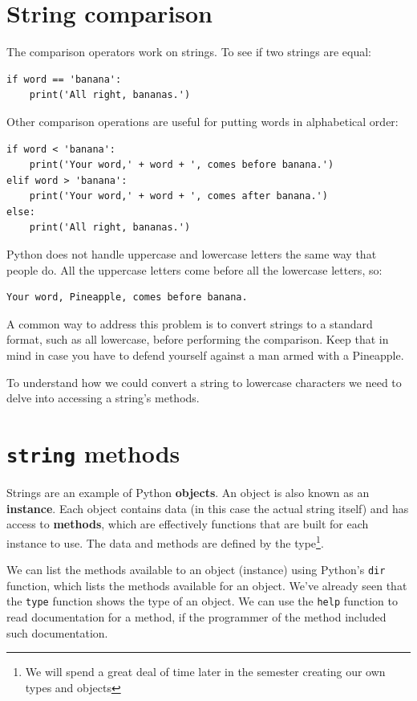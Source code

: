 \section{String comparison}


The comparison operators work on strings.  To see if two strings are equal:

\beforeverb
\begin{verbatim}
if word == 'banana':
    print('All right, bananas.')
\end{verbatim}
\afterverb
%
Other comparison operations are useful for putting words in alphabetical
order:

\beforeverb
\begin{verbatim}
if word < 'banana':
    print('Your word,' + word + ', comes before banana.')
elif word > 'banana':
    print('Your word,' + word + ', comes after banana.')
else:
    print('All right, bananas.')
\end{verbatim}
\afterverb
%
Python does not handle uppercase and lowercase letters the same way
that people do.  All the uppercase letters come before all the
lowercase letters, so:

\beforeverb
\begin{verbatim}
Your word, Pineapple, comes before banana.
\end{verbatim}
\afterverb
%
A common way to address this problem is to convert strings to a
standard format, such as all lowercase, before performing the
comparison.  Keep that in mind in case you have to defend yourself
against a man armed with a Pineapple.

To understand how we could convert a string to lowercase characters we need to delve into accessing a string's methods.

\section{{\tt string} methods}

Strings are an example of Python {\bf objects}.  An object is also known as an {\bf instance}. Each object contains
data (in this case the actual string itself) and has access to {\bf methods}, which
are effectively functions that are built for each instance to use. The data and methods are defined by the type\footnote{We will spend a great deal of time later in the semester creating our own types and objects}.

We can list the methods available to an object (instance) using Python's {\tt dir} function, which lists the methods available
for an object.  We've already seen that the {\tt type} function shows the type of an object. We can use the {\tt help} function to read documentation for a method, if the programmer of the method included such documentation.

